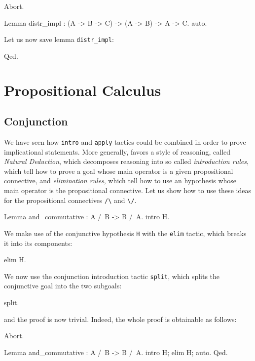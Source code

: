 \documentclass[11pt,a4paper]{book}
\begin{document}
\begin{coq_eval}
Abort.
\end{coq_eval}
\begin{coq_example}
Lemma distr_impl : (A -> B -> C) -> (A -> B) -> A -> C.
auto.
\end{coq_example}

Let us now save lemma \verb:distr_impl::
\begin{coq_example}
Qed.
\end{coq_example}

\section{Propositional Calculus}

\subsection{Conjunction}

We have seen how \verb:intro: and \verb:apply: tactics could be combined
in order to prove implicational statements. More generally, \Coq{} favors a style
of reasoning, called {\sl Natural Deduction}, which decomposes reasoning into 
so called {\sl introduction rules}, which tell how to prove a goal whose main 
operator is a given propositional connective, and {\sl elimination rules},
which tell how to use an hypothesis whose main operator is the propositional 
connective. Let us show how to use these ideas for the propositional connectives
\verb:/\: and \verb:\/:.

\begin{coq_example}
Lemma and_commutative : A /\ B -> B /\ A.
intro H.
\end{coq_example}

We make use of the conjunctive hypothesis \verb:H: with the \verb:elim: tactic,
which breaks it into its components:
\begin{coq_example}
elim H.
\end{coq_example}

We now use the conjunction introduction tactic \verb:split:, which splits the 
conjunctive goal into the two subgoals:
\begin{coq_example}
split.
\end{coq_example}
and the proof is now trivial. Indeed, the whole proof is obtainable as follows:
\begin{coq_eval}
Abort.
\end{coq_eval}
\begin{coq_example}
Lemma and_commutative : A /\ B -> B /\ A.
intro H; elim H; auto.
Qed.
\end{coq_example}
\end{document}
